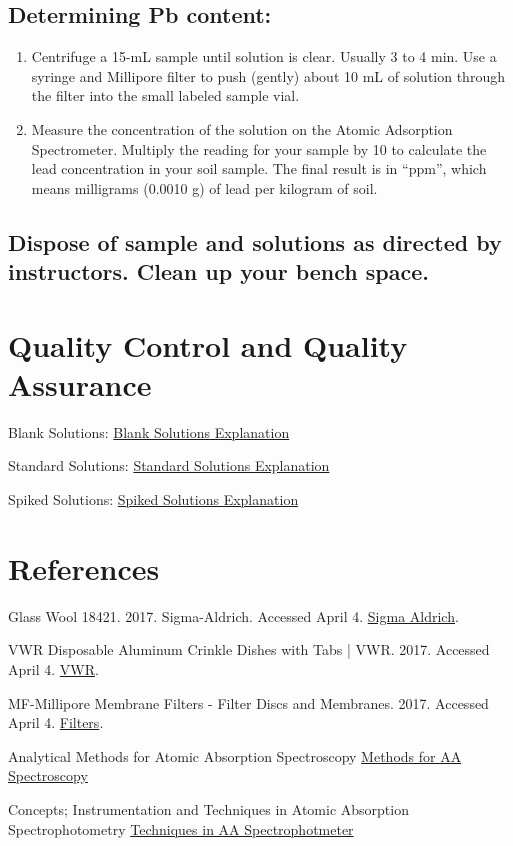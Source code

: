 \documentclass[12pt]{../SOP3_alpha}\usepackage[]{graphicx}\usepackage[]{color}
\begin{document}
\subsection {Determining Pb content:}
  \begin{enumerate}
    \item Centrifuge a 15-mL sample until solution is clear. Usually 3 to 4 min. Use a syringe and Millipore filter to push (gently) about 10 mL of solution through the filter into the small labeled sample vial.
    \item Measure the concentration of the solution on the Atomic Adsorption Spectrometer. Multiply the reading for your sample by 10 to calculate the lead concentration in your soil sample.  The final result is in “ppm”, which means milligrams (0.0010 g) of lead per kilogram of soil.
  \end{enumerate}
  
\subsection { Dispose of sample and solutions as directed by instructors. Clean up your bench space.}



\section{Quality Control and Quality Assurance}

\NP Blank Solutions: \href{https://en.wikipedia.org/wiki/Blank_(solution)}{Blank Solutions Explanation}

\NP Standard Solutions: \href{https://en.wikipedia.org/wiki/Standard_solution}{Standard Solutions Explanation}

\NP Spiked Solutions: \href{}{Spiked Solutions Explanation}



\section{References}



\NP Glass Wool 18421. 2017. Sigma-Aldrich. Accessed April 4. \href{http://www.sigmaaldrich.com/catalog/product/sial/18421}{Sigma Aldrich}.

\NP VWR Disposable Aluminum Crinkle Dishes with Tabs | VWR. 2017. Accessed April 4. \href{https://us.vwr.com/store/catalog/product.jsp?product_id=4622693}{VWR}.

\NP MF-Millipore Membrane Filters - Filter Discs and Membranes. 2017. Accessed April 4. \href{https://www.emdmillipore.com/US/en/product/MF-Millipore%E2%84%A2-Membrane-Filters,MM_NF-C152}{Filters}.

\NP Analytical Methods for Atomic Absorption Spectroscopy \href{http://www1.lasalle.edu/~prushan/Intrumental%20Analysis_files/AA-Perkin%20Elmer%20guide%20to%20all!.pdf}{Methods for AA Spectroscopy}

\NP Concepts; Instrumentation and Techniques in Atomic Absorption Spectrophotometry \href{http://www.ufjf.br/baccan/files/2011/05/AAS-Perkin1.pdf}{Techniques in AA Spectrophotmeter}
\end{document}
